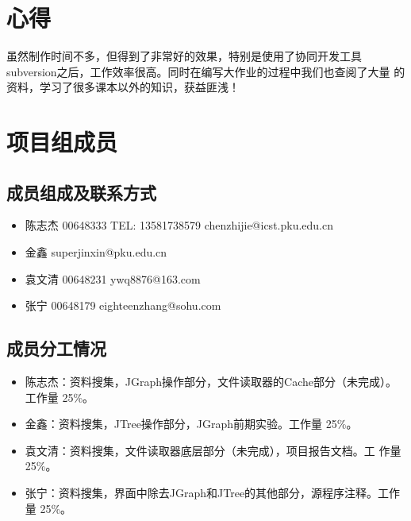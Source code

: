 \documentclass[a4paper,unicode=true,xetex]{article}
\begin{document}
\section{心得}

虽然制作时间不多，但得到了非常好的效果，特别是使用了协同开发工具%
subversion之后，工作效率很高。同时在编写大作业的过程中我们也查阅了大量%
的资料，学习了很多课本以外的知识，获益匪浅！


\section{项目组成员}

\subsection{成员组成及联系方式}
\begin{itemize}
\item 陈志杰 00648333 TEL: 13581738579  chenzhijie@icst.pku.edu.cn
\item 金鑫 superjinxin@pku.edu.cn
\item 袁文清 00648231 ywq8876@163.com
\item 张宁 00648179 eighteenzhang@sohu.com
\end{itemize}

\subsection{成员分工情况}

\begin{itemize}
\item 陈志杰：资料搜集，JGraph操作部分，文件读取器的Cache部分（未完成）。
  工作量 25\%。
\item 金鑫：资料搜集，JTree操作部分，JGraph前期实验。工作量 25\%。
\item 袁文清：资料搜集，文件读取器底层部分（未完成），项目报告文档。工
  作量 25\%。
\item 张宁：资料搜集，界面中除去JGraph和JTree的其他部分，源程序注释。工作量 25\%。
\end{itemize}
\end{document}
